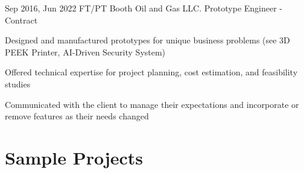 \documentclass[
	10pt, %
]{FreemanCV}
\begin{document}

\jobentry
	{Sep 2016, Jun 2022} %
	{FT/PT} %
	{Booth Oil and Gas LLC.} %
	{Prototype Engineer - Contract} %
	{ %
		\item Designed and manufactured prototypes for unique business problems (see 3D PEEK Printer, AI-Driven Security System)
		\item Offered technical expertise for project planning, cost estimation, and feasibility studies
		\item Communicated with the client to manage their expectations and incorporate or remove features as their needs changed
	}
	





\vspace*{-10pt}
\section{Sample Projects}
\setlength{\columnsep}{10pt}
\end{document}
